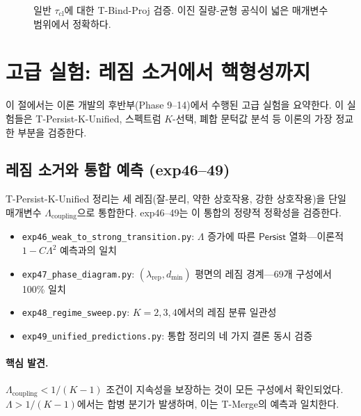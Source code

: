 \begin{figure}[t]
\centering
{}
\caption{일반 $\tau_{\mathrm{cl}}$에 대한 T-Bind-Proj 검증. 이진 질량-균형 공식이 넓은 매개변수 범위에서 정확하다.}
\label{fig:bind-tau}
\end{figure}


\section{고급 실험: 레짐 소거에서 핵형성까지}
\label{sec:exp-advanced}

이 절에서는 이론 개발의 후반부(Phase 9--14)에서 수행된 고급 실험을 요약한다. 이 실험들은 T-Persist-K-Unified, 스펙트럼 $K$-선택, 폐합 문턱값 분석 등 이론의 가장 정교한 부분을 검증한다.

\subsection{레짐 소거와 통합 예측 (exp46--49)}

T-Persist-K-Unified 정리는 세 레짐(잘-분리, 약한 상호작용, 강한 상호작용)을 단일 매개변수 $\Lambda_{\mathrm{coupling}}$으로 통합한다. exp46--49는 이 통합의 정량적 정확성을 검증한다.

\begin{itemize}
    \item \texttt{exp46\_weak\_to\_strong\_transition.py}: $\Lambda$ 증가에 따른 $\mathsf{Persist}$ 열화---이론적 $1 - C\Lambda^2$ 예측과의 일치
    \item \texttt{exp47\_phase\_diagram.py}: $(\lambda_{\mathrm{rep}}, d_{\min})$ 평면의 레짐 경계---69개 구성에서 100\% 일치
    \item \texttt{exp48\_regime\_sweep.py}: $K = 2, 3, 4$에서의 레짐 분류 일관성
    \item \texttt{exp49\_unified\_predictions.py}: 통합 정리의 네 가지 결론 동시 검증
\end{itemize}

\paragraph{핵심 발견.} $\Lambda_{\mathrm{coupling}} < 1/(K-1)$ 조건이 지속성을 보장하는 것이 모든 구성에서 확인되었다. $\Lambda > 1/(K-1)$에서는 합병 분기가 발생하며, 이는 T-Merge의 예측과 일치한다.

